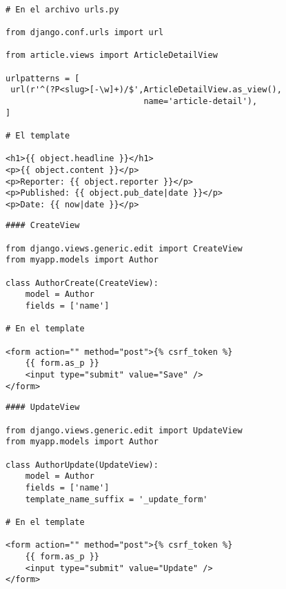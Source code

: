 \documentclass[xcolor=dvipsnames]{beamer}
\begin{document}
\begin{frame}[fragile]
\begin{verbatim}

# En el archivo urls.py

from django.conf.urls import url

from article.views import ArticleDetailView

urlpatterns = [
 url(r'^(?P<slug>[-\w]+)/$',ArticleDetailView.as_view(),
                            name='article-detail'),
]

# El template

<h1>{{ object.headline }}</h1>
<p>{{ object.content }}</p>
<p>Reporter: {{ object.reporter }}</p>
<p>Published: {{ object.pub_date|date }}</p>
<p>Date: {{ now|date }}</p>
\end{verbatim}
\end{frame}

\begin{frame}[fragile]
\begin{verbatim}
#### CreateView

from django.views.generic.edit import CreateView
from myapp.models import Author

class AuthorCreate(CreateView):
    model = Author
    fields = ['name']

# En el template

<form action="" method="post">{% csrf_token %}
    {{ form.as_p }}
    <input type="submit" value="Save" />
</form>

\end{verbatim}
\end{frame}

\begin{frame}[fragile]
\begin{verbatim}
#### UpdateView

from django.views.generic.edit import UpdateView
from myapp.models import Author

class AuthorUpdate(UpdateView):
    model = Author
    fields = ['name']
    template_name_suffix = '_update_form'
    
# En el template

<form action="" method="post">{% csrf_token %}
    {{ form.as_p }}
    <input type="submit" value="Update" />
</form>

\end{verbatim}
\end{frame}
\end{document}
